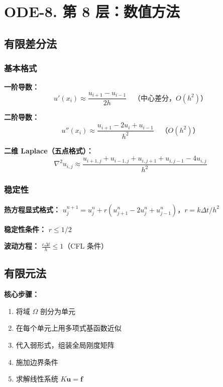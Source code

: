 \section{ODE-8. 第 8 层：数值方法}
\label{sec:de-numerics}

\subsection{有限差分法}

\subsubsection{基本格式}

\textbf{一阶导数：}
\[
u'(x_i) \approx \frac{u_{i+1} - u_{i-1}}{2h} \quad \text{（中心差分，$O(h^2)$）}
\]

\textbf{二阶导数：}
\[
u''(x_i) \approx \frac{u_{i+1} - 2u_i + u_{i-1}}{h^2} \quad \text{（$O(h^2)$）}
\]

\textbf{二维 Laplace（五点格式）：}
\[
\nabla^2 u_{i,j} \approx \frac{u_{i+1,j} + u_{i-1,j} + u_{i,j+1} + u_{i,j-1} - 4u_{i,j}}{h^2}
\]

\subsubsection{稳定性}

\textbf{热方程显式格式：} $u_j^{n+1} = u_j^n + r(u_{j+1}^n - 2u_j^n + u_{j-1}^n)$，$r = k\Delta t/h^2$

\textbf{稳定性条件：} $r \leq 1/2$

\textbf{波动方程：} $\frac{c\Delta t}{h} \leq 1$（CFL 条件）

\subsection{有限元法}

\textbf{核心步骤：}
\begin{enumerate}
  \item 将域 $\Omega$ 剖分为单元
  \item 在每个单元上用多项式基函数近似
  \item 代入弱形式，组装全局刚度矩阵
  \item 施加边界条件
  \item 求解线性系统 $K\mathbf{u} = \mathbf{f}$
\end{enumerate}

